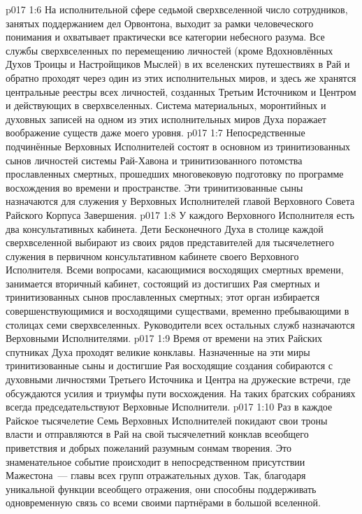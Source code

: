 \vs p017 1:6 На исполнительной сфере седьмой сверхвселенной число сотрудников, занятых поддержанием дел Орвонтона, выходит за рамки человеческого понимания и охватывает практически все категории небесного разума. Все службы сверхвселенных по перемещению личностей (кроме Вдохновлённых Духов Троицы и Настройщиков Мыслей) в их вселенских путешествиях в Рай и обратно проходят через один из этих исполнительных миров, и здесь же хранятся центральные реестры всех личностей, созданных Третьим Источником и Центром и действующих в сверхвселенных. Система материальных, моронтийных и духовных записей на одном из этих исполнительных миров Духа поражает воображение существ даже моего уровня.
\vs p017 1:7 Непосредственные подчинённые Верховных Исполнителей состоят в основном из тринитизованных сынов личностей системы Рай\hyp{}Хавона и тринитизованного потомства прославленных смертных, прошедших многовековую подготовку по программе восхождения во времени и пространстве. Эти тринитизованные сыны назначаются для служения у Верховных Исполнителей главой Верховного Совета Райского Корпуса Завершения.
\vs p017 1:8 У каждого Верховного Исполнителя есть два консультативных кабинета. Дети Бесконечного Духа в столице каждой сверхвселенной выбирают из своих рядов представителей для тысячелетнего служения в первичном консультативном кабинете своего Верховного Исполнителя. Всеми вопросами, касающимися восходящих смертных времени, занимается вторичный кабинет, состоящий из достигших Рая смертных и тринитизованных сынов прославленных смертных; этот орган избирается совершенствующимися и восходящими существами, временно пребывающими в столицах семи сверхвселенных. Руководители всех остальных служб назначаются Верховными Исполнителями.
\vs p017 1:9 \pc Время от времени на этих Райских спутниках Духа проходят великие конклавы. Назначенные на эти миры тринитизованные сыны и достигшие Рая восходящие создания собираются с духовными личностями Третьего Источника и Центра на дружеские встречи, где обсуждаются усилия и триумфы пути восхождения. На таких братских собраниях всегда председательствуют Верховные Исполнители.
\vs p017 1:10 Раз в каждое Райское тысячелетие Семь Верховных Исполнителей покидают свои троны власти и отправляются в Рай на свой тысячелетний конклав всеобщего приветствия и добрых пожеланий разумным сонмам творения. Это знаменательное событие происходит в непосредственном присутствии Мажестона~--- главы всех групп отражательных духов. Так, благодаря уникальной функции всеобщего отражения, они способны поддерживать одновременную связь со всеми своими партнёрами в большой вселенной.
